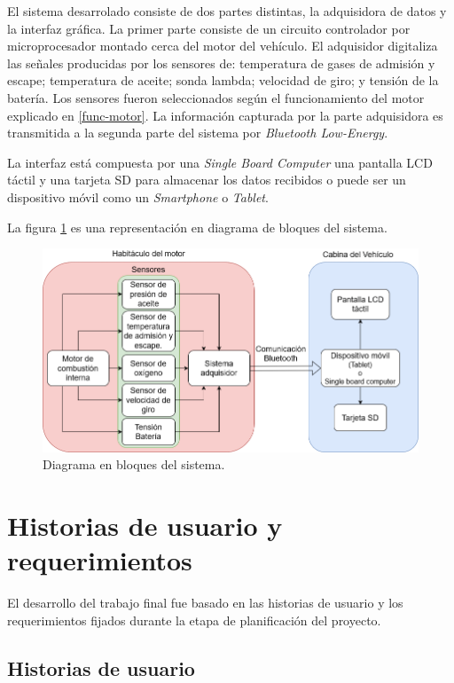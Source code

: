 El sistema desarrolado consiste de dos partes distintas, la adquisidora de datos y la interfaz gráfica. La primer parte consiste de un circuito controlador por microprocesador montado cerca del motor del vehículo. El adquisidor digitaliza las señales producidas por los sensores de: temperatura de gases de admisión y escape; temperatura de aceite; sonda lambda; velocidad de giro; y tensión de la batería. Los sensores fueron seleccionados según el funcionamiento del motor explicado en \ref{func-motor}.  La información capturada por la parte adquisidora es transmitida a la segunda parte del sistema por \textit{Bluetooth Low-Energy}.

La interfaz está compuesta por una \textit{Single Board Computer} una pantalla LCD táctil y una tarjeta SD para almacenar los datos recibidos o puede ser un dispositivo móvil como un \textit{Smartphone} o \textit{Tablet}.

La figura \ref{fig:diagrama-de-bloques} es una representación en diagrama de bloques del sistema.

\begin{figure}
\includegraphics[width=.9\textwidth]{./Figures/diagrama-proyecto.png}
\caption{Diagrama en bloques del sistema.}
\label{fig:diagrama-de-bloques}
\end{figure}

\section{Historias de usuario y requerimientos}

El desarrollo del trabajo final fue basado en las historias de usuario y los requerimientos fijados durante la etapa de planificación del proyecto.

\subsection{Historias de usuario}\label{historias-usuario}

